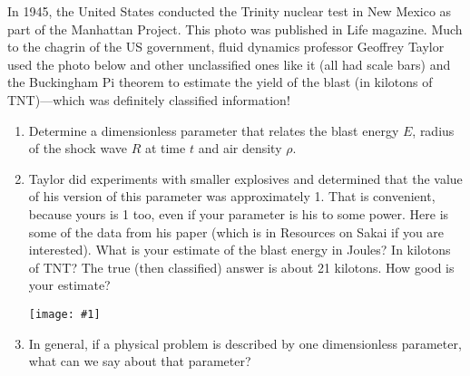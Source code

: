 \documentclass[12pt,letterpaper]{hmcpset}
\newcommand{\diagram}[2]{\begin{center}\texttt{[image: \#1]}\end{center}}
\begin{document}
\begin{problem}[2] 
	In 1945, the United States conducted the Trinity nuclear test in New Mexico as part of the	Manhattan Project. This photo was published in Life magazine. Much to the chagrin of the	US government, fluid dynamics professor Geoffrey Taylor used the photo below and other	unclassified ones like it (all had scale bars) and the Buckingham Pi theorem to estimate the	yield of the blast (in kilotons of TNT)---which was definitely classified information!
	\begin{enumerate}
		\item Determine a dimensionless parameter that relates the blast energy $E$, radius of the shock
		wave $R$ at time $t$ and air density $\rho$.
		
		\item Taylor did experiments with smaller explosives and determined that the value of his
		version of this parameter was approximately 1. That is convenient, because yours is 1
		too, even if your parameter is his to some power. Here is some of the data from his
		paper (which is in Resources on Sakai if you are interested). What is your estimate of
		the blast energy in Joules? In kilotons of TNT? The true (then classified) answer is
		about 21 kilotons. How good is your estimate?
		\diagram{Explosion_1}{3}
		
		\item In general, if a physical problem is described by one dimensionless parameter, what can
		we say about that parameter?
	\end{enumerate}
\end{problem}

\begin{solution}
	\vfill
\end{solution}

\newpage
\end{document}
